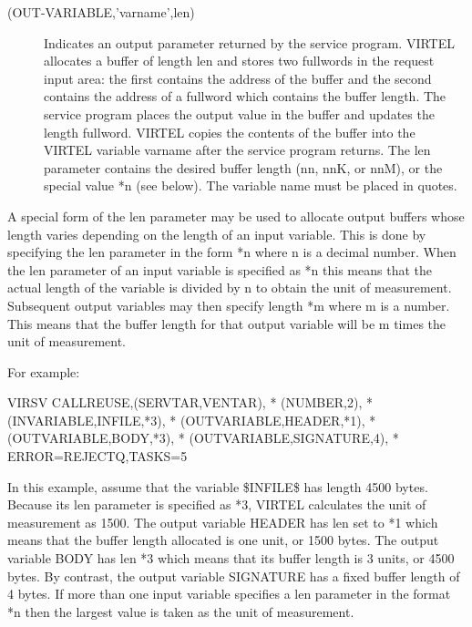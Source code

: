 \documentclass[letterpaper,10pt,english]{sphinxmanual}
\begin{document}
\begin{description}
\item[{(OUT-VARIABLE,’varname’,len)}] \leavevmode
Indicates an output parameter returned by the service program. VIRTEL allocates a buffer of length len and stores two fullwords in the request input area: the first contains the address of the buffer and the second contains the address of a fullword which contains the buffer length. The service program places the output value in the buffer and updates the length fullword. VIRTEL copies the contents of the buffer into the VIRTEL variable varname after the service program returns. The len parameter contains the desired buffer length (nn, nnK, or nnM), or the special value *n (see below). The variable name must be placed in quotes.

\end{description}


A special form of the len parameter may be used to allocate output buffers whose length varies depending on the
length of an input variable. This is done by specifying the len parameter in the form *n where n is a decimal number.
When the len parameter of an input variable is specified as *n this means that the actual length of the variable is
divided by n to obtain the unit of measurement. Subsequent output variables may then specify length *m where m is a
number. This means that the buffer length for that output variable will be m times the unit of measurement.

For example:

\begin{sphinxVerbatim}[commandchars=\\\{\}]
VIRSV\PYGZdl{} CALL\PYGZhy{}REUSE,(\PYGZsq{}SERVTAR\PYGZsq{},\PYGZsq{}VENTAR\PYGZsq{}),               *
        (NUMBER,\PYGZsq{}2\PYGZsq{}),                                 *
        (IN\PYGZhy{}VARIABLE,\PYGZsq{}\PYGZdl{}INFILE\PYGZdl{}\PYGZsq{},*3),                  *
        (OUT\PYGZhy{}VARIABLE,\PYGZsq{}HEADER\PYGZsq{},*1),                   *
        (OUT\PYGZhy{}VARIABLE,\PYGZsq{}BODY\PYGZsq{},*3),                     *
        (OUT\PYGZhy{}VARIABLE,\PYGZsq{}SIGNATURE\PYGZsq{},4),                 *
        ERROR=REJECTQ,TASKS=5
\end{sphinxVerbatim}

In this example, assume that the variable \$INFILE\$ has length 4500 bytes. Because its len parameter is specified as *3,
VIRTEL calculates the unit of measurement as 1500. The output variable HEADER has len set to *1 which means that
the buffer length allocated is one unit, or 1500 bytes. The output variable BODY has len *3 which means that its buffer
length is 3 units, or 4500 bytes. By contrast, the output variable SIGNATURE has a fixed buffer length of 4 bytes.
If more than one input variable specifies a len parameter in the format *n then the largest value is taken as the unit of
measurement.
\end{document}
